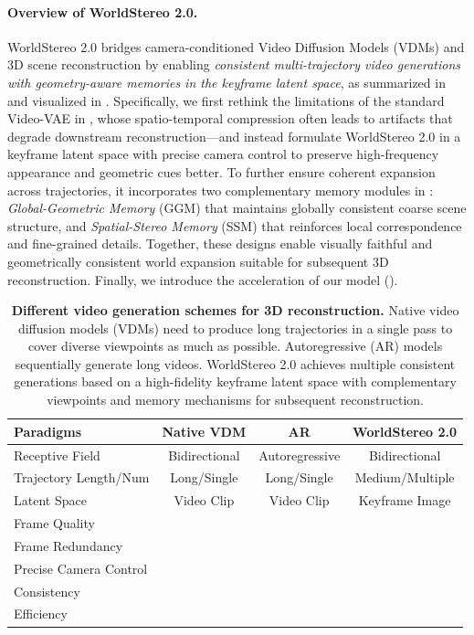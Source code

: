 \documentclass{article} %
\newcommand{\good}{\Smiley[1.2][goodgreen!60!white]}
\newcommand{\bad}{\Sadey[1.2][badred!60!white]}
\newcommand{\normal}{\Neutrey[1.2][normalyellow!80!orange]}
\begin{document}
\paragraph{Overview of WorldStereo 2.0.}
WorldStereo 2.0 bridges camera-conditioned Video Diffusion Models (VDMs) and 3D scene reconstruction by enabling \emph{consistent multi-trajectory video generations with geometry-aware memories in the keyframe latent space}, as summarized in  and visualized in .
Specifically, we first rethink the limitations of the standard Video-VAE in , whose spatio-temporal compression often leads to artifacts that degrade downstream reconstruction---and instead formulate WorldStereo 2.0 in a keyframe latent space with precise camera control to preserve high-frequency appearance and geometric cues better.
To further ensure coherent expansion across trajectories, it incorporates two complementary memory modules in : \emph{Global-Geometric Memory} (GGM) that maintains globally consistent coarse scene structure, and \emph{Spatial-Stereo Memory} (SSM) that reinforces local correspondence and fine-grained details. Together, these designs enable visually faithful and geometrically consistent world expansion suitable for subsequent 3D reconstruction.
Finally, we introduce the acceleration of our model ().

\begin{table}
\centering
\caption{\textbf{Different video generation schemes for 3D reconstruction.} Native video diffusion models (VDMs) need to produce long trajectories in a single pass to cover diverse viewpoints as much as possible. Autoregressive (AR) models sequentially generate long videos. WorldStereo 2.0 achieves multiple consistent generations based on a high-fidelity keyframe latent space with complementary viewpoints and memory mechanisms for subsequent reconstruction.\label{tab:vdm_comparison}}
\small
\begin{tabular}{lccc}
\toprule
\textbf{Paradigms} & \textbf{Native VDM} & \textbf{AR} & \textbf{WorldStereo 2.0} \\
\midrule
Receptive Field & Bidirectional & Autoregressive & Bidirectional \\
Trajectory Length/Num & Long/Single & Long/Single & Medium/Multiple \\
Latent Space & Video Clip & Video Clip & Keyframe Image \\
\midrule
Frame Quality & \normal & \bad & \good \\
Frame Redundancy & \bad & \bad & \good \\
Precise Camera Control & \good & \normal & \good \\
Consistency & \normal & \normal & \good \\
Efficiency & \bad & \good & \good \\
\bottomrule
\end{tabular}
\vspace{-0.1in}
\end{table}
\end{document}
